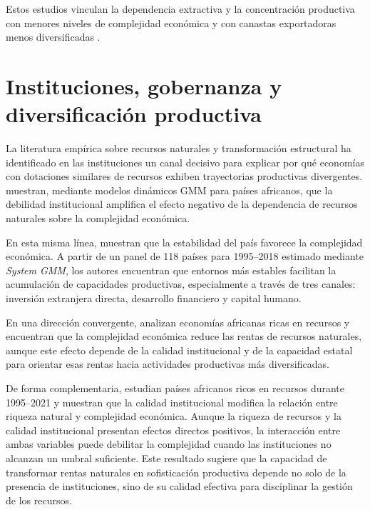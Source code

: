 \documentclass[../../TFM.tex]{subfiles}
\begin{document}
	Estos estudios vinculan la dependencia extractiva y la concentración productiva con menores niveles de complejidad económica y con canastas exportadoras menos diversificadas \parencite{Canh2020,Bahar2018,Joya2015,Lashitew2021}.

	\section{Instituciones, gobernanza y diversificación productiva}
	\label{sec:instituciones-gobernanza-diversificacion}
	
	La literatura empírica sobre recursos naturales y transformación estructural ha identificado en las instituciones un canal decisivo para explicar por qué economías con dotaciones similares de recursos exhiben trayectorias productivas divergentes. \textcite{Ajide2022} muestran, mediante modelos dinámicos GMM para países africanos, que la debilidad institucional amplifica el efecto negativo de la dependencia de recursos naturales sobre la complejidad económica.
	
	En esta misma línea, \textcite{AvomNdoya2024} muestran que la estabilidad del país favorece la complejidad económica. A partir de un panel de 118 países para 1995--2018 estimado mediante \textit{System GMM}, los autores encuentran que entornos más estables facilitan la acumulación de capacidades productivas, especialmente a través de tres canales: inversión extranjera directa, desarrollo financiero y capital humano.
	
	En una dirección convergente, \textcite{Olaniyi-Odhiambo2025-3} analizan economías africanas ricas en recursos y encuentran que la complejidad económica reduce las rentas de recursos naturales, aunque este efecto depende de la calidad institucional y de la capacidad estatal para orientar esas rentas hacia actividades productivas más diversificadas.

	De forma complementaria, \textcite{Olaniyi-Odhiambo2025} estudian países africanos ricos en recursos durante 1995--2021 y muestran que la calidad institucional modifica la relación entre riqueza natural y complejidad económica. Aunque la riqueza de recursos y la calidad institucional presentan efectos directos positivos, la interacción entre ambas variables puede debilitar la complejidad cuando las instituciones no alcanzan un umbral suficiente. Este resultado sugiere que la capacidad de transformar rentas naturales en sofisticación productiva depende no solo de la presencia de instituciones, sino de su calidad efectiva para disciplinar la gestión de los recursos.
	
\end{document}
